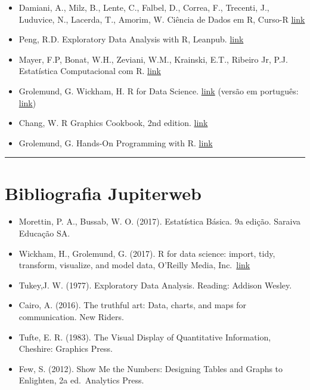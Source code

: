 \documentclass[
]{book}
\begin{document}
\begin{itemize}
\item
  Damiani, A., Milz, B., Lente, C., Falbel, D., Correa, F., Trecenti, J., Luduvice, N., Lacerda, T., Amorim, W. Ciência de Dados em R, Curso-R \href{https://livro.curso-r.com/}{link}
\item
  Peng, R.D. Exploratory Data Analysis with R, Leanpub. \href{https://bookdown.org/rdpeng/exdata/}{link}
\item
  Mayer, F.P, Bonat, W.H., Zeviani, W.M., Krainski, E.T., Ribeiro Jr, P.J. Estatística Computacional com R. \href{http://cursos.leg.ufpr.br/ecr/index.html}{link}
\item
  Grolemund, G. Wickham, H. R for Data Science. \href{https://r4ds.hadley.nz/}{link} (versão em português: \href{https://pt.r4ds.hadley.nz/}{link})
\item
  Chang, W. R Graphics Cookbook, 2nd edition. \href{Chang,\%20W.\%20R\%20Graphics\%20Cookbook,\%202nd\%20edition.}{link}
\item
  Grolemund, G. Hands-On Programming with R. \href{https://jjallaire.github.io/hopr/}{link}
\end{itemize}

\begin{center}\rule{0.5\linewidth}{0.5pt}\end{center}

\section{Bibliografia Jupiterweb}\label{bibliografia-jupiterweb}

\begin{itemize}
\item
  Morettin, P. A., Bussab, W. O. (2017). Estatística Básica. 9a edição. Saraiva Educação SA.
\item
  Wickham, H., Grolemund, G. (2017). R for data science: import, tidy, transform, visualize, and model data, O'Reilly Media, Inc.~\href{https://r4ds.hadley.nz/}{link}
\item
  Tukey,J. W. (1977). Exploratory Data Analysis. Reading: Addison Wesley.
\item
  Cairo, A. (2016). The truthful art: Data, charts, and maps for communication. New Riders.
\item
  Tufte, E. R. (1983). The Visual Display of Quantitative Information, Cheshire: Graphics Press.
\item
  Few, S. (2012). Show Me the Numbers: Designing Tables and Graphs to Enlighten, 2a ed.~Analytics Press.
\end{itemize}
\end{document}
